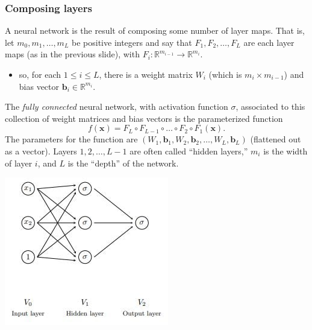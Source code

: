 \documentclass[smaller]{beamer}
\theoremstyle{example}
\newcommand{\x}{\textbf{x}}
\begin{document}
\begin{frame}
    \frametitle{Composing layers}
    A neural network is the result of composing some number of layer maps. That is, let $m_0, m_1,\ldots, m_L$ be positive integers and say that $F_1, F_2,\ldots, F_L$ are each layer maps (as in the previous slide), with $F_i:\mathbb R^{m_{i-1}}\to \mathbb R^{m_i}$.
    \begin{itemize}
        \item so, for each $1\le i\le L$, there is a weight matrix $W_i$ (which is $m_i\times m_{i-1}$) and bias vector $\textbf{b}_i \in \mathbb R^{m_i}$.
    \end{itemize}
    \pause

    The \textit{fully connected} neural network, with activation function $\sigma$, associated to this collection of weight matrices and bias vectors is the parameterized function 
        \[f(\x) = F_L\circ F_{L-1}\circ \ldots \circ F_2\circ F_1(\x).\]
    \pause
    The parameters for the function are $(W_1,\textbf{b}_1, W_2, \textbf{b}_2, \ldots, W_L, \textbf{b}_L)$ (flattened out as a vector). Layers $1,2,\ldots, L-1$ are often called ``hidden layers,'' $m_i$ is the width of layer $i$, and $L$ is the ``depth'' of the network.
    
    \centering
    \includegraphics[height=0.3\textheight]{../../Images/simple-neural-net.jpg}
\end{frame}
\end{document}
